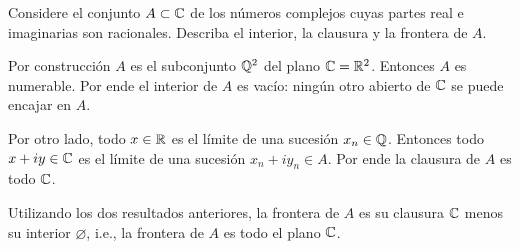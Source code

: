 \begin{exercise}
Considere el conjunto $A \subset \mathbb C$ de los números complejos cuyas partes real e imaginarias son racionales. Describa el interior, la clausura y la frontera de $A$.
\end{exercise}

\begin{solution}
Por construcción $A$ es el subconjunto $\mathbb Q^2$ del plano $\mathbb C = \mathbb R^2$. Entonces $A$ es numerable. Por ende el interior de $A$ es vacío: ningún otro abierto de $\mathbb C$ se puede encajar en $A$.

Por otro lado, todo $x \in \mathbb R$ es el límite de una sucesión $x_n \in \mathbb Q$. Entonces todo $x + iy \in \mathbb C$ es el límite de una sucesión $x_n + iy_n \in A$. Por ende la clausura de $A$ es todo $\mathbb C$.

Utilizando los dos resultados anteriores, la frontera de $A$ es su clausura $\mathbb C$ menos su interior $\varnothing$, i.e., la frontera de $A$ es todo el plano $\mathbb C$.
\end{solution}
